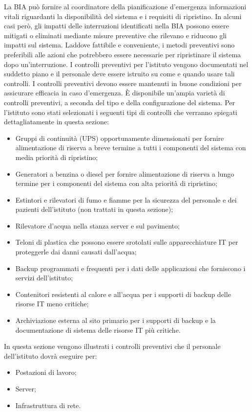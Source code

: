 \documentclass[12pt, a4paper, titlepage]{report}
\begin{document}
	La BIA può fornire al coordinatore della pianificazione d'emergenza informazioni vitali riguardanti la disponibilità
	del sistema e i requisiti di ripristino. In alcuni casi però, gli impatti delle interruzioni identificati nella BIA possono essere
	mitigati o eliminati mediante misure preventive che rilevano e riducono gli impatti sul sistema. Laddove fattibile e conveniente, i
	metodi preventivi sono preferibili alle azioni che potrebbero essere necessarie per ripristinare il sistema dopo un'interruzione.
	I controlli preventivi per l'istituto vengono documentati nel suddetto piano e il personale deve essere istruito su come e quando usare
	tali controlli. I controlli preventivi devono essere mantenuti in buone condizioni per assicurare efficacia in caso d'emergenza.
	È disponibile un'ampia varietà di controlli preventivi, a seconda del tipo e della configurazione del sistema. Per l'istituto sono
	stati selezionati i seguenti tipi di controlli che verranno spiegati dettagliatamente in questa sezione:
	\begin{itemize}
		 \item Gruppi di continuità (UPS) opportunamente dimensionati per fornire alimentazione di riserva a breve termine a tutti
		 i componenti del sistema con media priorità di ripristino;
		 \item Generatori a benzina o diesel per fornire alimentazione di riserva a lungo termine per i componenti del sistema con alta priorità
		 di ripristino;
		 \item Estintori e rilevatori di fumo e fiamme per la sicurezza del personale e dei pazienti dell'istituto (non trattati in questa
		 sezione);
		 \item Rilevatore d'acqua nella stanza server e sul pavimento;
		 \item Teloni di plastica che possono essere srotolati sulle apparecchiature IT per proteggerle dai danni causati dall'acqua;
		 \item Backup programmati e frequenti per i dati delle applicazioni che forniscono i servizi dell'istituto;
		 \item Contenitori resistenti al calore e all'acqua per i supporti di backup delle risorse IT meno critiche;
		 \item Archiviazione esterna al sito primario per i supporti di backup e la documentazione di sistema delle risorse IT più critiche.
	\end{itemize}
	In questa sezione vengono illustrati i controlli preventivi che il personale dell'istituto dovrà eseguire per:
	\begin{itemize}
		\item Postazioni di lavoro;
		\item Server;
		\item Infrastruttura di rete.
	\end{itemize}
	
\end{document}
